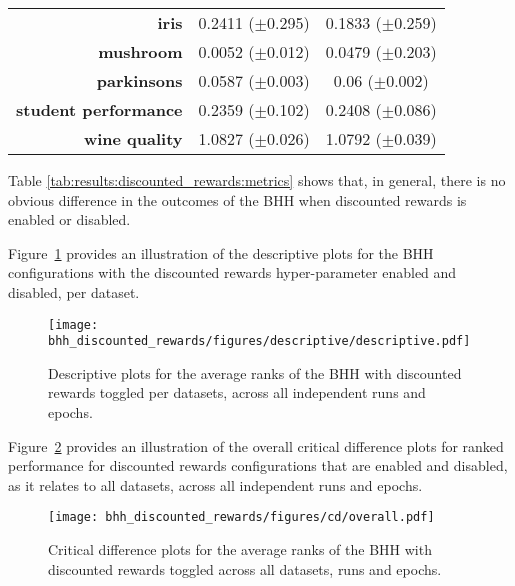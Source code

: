 \begin{table}[htb]
{\begin{tabular}{r|cc}
			\textbf{iris}                & \cellcolor[rgb]{ .973,  .412,  .42}0.2411 ($\pm$0.295)              & \cellcolor[rgb]{ .388,  .745,  .482}0.1833 ($\pm$0.259) \\
			\textbf{mushroom}            & \cellcolor[rgb]{ .388,  .745,  .482}0.0052 ($\pm$0.012)             & \cellcolor[rgb]{ .973,  .412,  .42}0.0479 ($\pm$0.203)  \\
			\textbf{parkinsons}          & \cellcolor[rgb]{ .388,  .745,  .482}0.0587 ($\pm$0.003)             & \cellcolor[rgb]{ .973,  .412,  .42}0.06 ($\pm$0.002)    \\
			\textbf{student performance} & \cellcolor[rgb]{ .388,  .745,  .482}0.2359 ($\pm$0.102)             & \cellcolor[rgb]{ .973,  .412,  .42}0.2408 ($\pm$0.086)  \\
			\textbf{wine quality}        & \cellcolor[rgb]{ .973,  .412,  .42}1.0827 ($\pm$0.026)              & \cellcolor[rgb]{ .388,  .745,  .482}1.0792 ($\pm$0.039) \\
		\end{tabular}%


	}
\end{table}%

Table \ref{tab:results:discounted_rewards:metrics} shows that, in general, there is no obvious difference in the outcomes of the \acs{BHH} when discounted rewards is enabled or disabled.

Figure~\ref{fig:results:discounted_rewards:descriptive:descriptive} provides an illustration of the descriptive plots for the \acs{BHH} configurations with the discounted rewards hyper-parameter enabled and disabled, per dataset.

\begin{figure}[htb]
	\centering
	\texttt{[image: bhh\_discounted\_rewards/figures/descriptive/descriptive.pdf]}
	\caption{Descriptive plots for the average ranks of the \acs{BHH} with discounted rewards toggled per datasets, across all independent runs and epochs.}
	\label{fig:results:discounted_rewards:descriptive:descriptive}
\end{figure}

Figure~\ref{fig:results:discounted_rewards:descriptive:cd} provides an illustration of the overall critical difference plots for ranked performance for discounted rewards configurations that are enabled and disabled, as it relates to all datasets, across all independent runs and epochs.

\begin{figure}[htb]
	\centering
	\texttt{[image: bhh\_discounted\_rewards/figures/cd/overall.pdf]}
	\caption{Critical difference plots for the average ranks of the \acs{BHH} with discounted rewards toggled across all datasets, runs and epochs.}
	\label{fig:results:discounted_rewards:descriptive:cd}
\end{figure}

